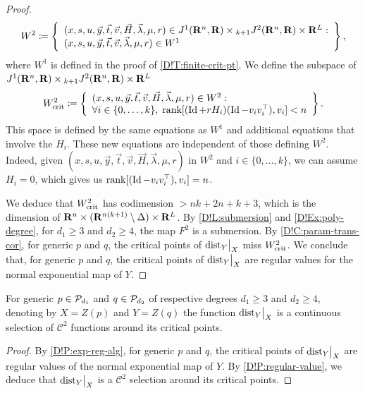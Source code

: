 \begin{proof}
  \[
    W^2 \coloneq \left\{
    \begin{array}{l}
      (x, s, u, \vec{y}, \vec{t}, \vec{v}, \vec{H}, \vec{\lambda}, \mu, r) \in J^1(\mathbf{R}^n, \mathbf{R}) \times {}_{k + 1} J^2(\mathbf{R}^n, \mathbf{R}) \times \mathbf{R}^{L} : \\
      (x, s, u, \vec{y}, \vec{t}, \vec{v}, \vec{\lambda}, \mu, r) \in W^1
    \end{array}
    \right\},
  \]
  where $W^1$ is defined in the proof of \cref{D!T:finite-crit-pt}. We define the subspace of $J^1(\mathbf{R}^n, \mathbf{R}) \times {}_{k + 1} J^2(\mathbf{R}^n, \mathbf{R}) \times \mathbf{R}^L$
  \[
    W^2_{\textnormal{crit}} \coloneq \left\{
    \begin{array}{l}
      (x, s, u, \vec{y}, \vec{t}, \vec{v}, \vec{H}, \vec{\lambda}, \mu, r) \in W^2 : \\
      \forall i \in \{0, \ldots, k\}, \; \textnormal{rank}[(\operatorname{Id} + r H_i) (\operatorname{Id} - v_i v_i^\top), v_i] < n
    \end{array}
    \right\}.
  \]
  This space is defined by the same equations as $W^1$ and additional equations that involve the $H_i$. These new equations are independent of those defining $W^2$. Indeed, given $(x, s, u, \vec{y}, \vec{t}, \vec{v}, \vec{H}, \vec{\lambda}, \mu, r)$ in $W^2$ and $i \in \{0, \ldots, k\}$, we can assume $H_i = 0$, which gives us $\operatorname{rank}[(\operatorname{Id} - v_i v_i^\top), v_i] = n$.

  We deduce that $W^2_{\textnormal{crit}}$ has codimension $> nk + 2n + k + 3$, which is the dimension of $\mathbf{R}^n \times (\mathbf{R}^{n(k + 1)} \setminus \Delta) \times \mathbf{R}^L$. 
  By \cref{D!L:submersion} and \cref{D!Ex:poly-degree}, for $d_1 \geq 3$ and $d_2 \geq 4$, the map $F^2$ is a submersion.
  By \cref{D!C:param-trans-cor}, for generic $p$ and $q$, the critical points of $\mathord{\operatorname{dist}}_Y\big|_X$ miss $W^2_{\textnormal{crit}}$. We conclude that, for generic $p$ and $q$, the critical points of $\mathord{\operatorname{dist}}_Y\big|_X$ are regular values for the normal exponential map of $Y$.
\end{proof}

\begin{corollary}
\label{D!C:C2selection}
  For generic $p\in \mathcal{P}_{d_1}$ and $q\in \mathcal{P}_{d_2}$ of respective degrees $d_1 \geq 3$ and $d_2\geq 4$, denoting by $X=Z(p)$ and $Y=Z(q)$ the function $\mathord{\operatorname{dist}}_Y\big|_X$ is a continuous selection of $\mathcal{C}^2$ functions around its critical points.
\end{corollary}

\begin{proof}
  By \cref{D!P:exp-reg-alg}, for generic $p$ and $q$, the critical points of $\mathord{\operatorname{dist}}_Y\big|_X$ are regular values of the normal exponential map of $Y$. By \cref{D!P:regular-value}, we deduce that $\mathord{\operatorname{dist}}_Y\big|_X$ is a $\mathcal{C}^2$ selection around its critical points.
\end{proof}

